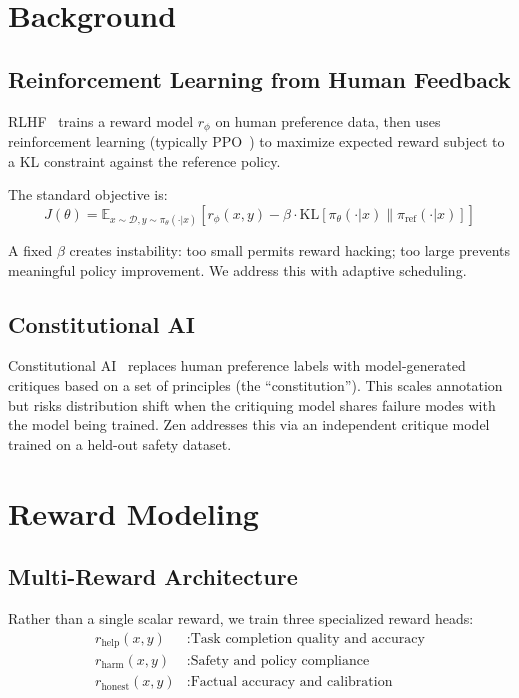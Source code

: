 \documentclass[11pt,a4paper]{article}
\begin{document}
\section{Background}

\subsection{Reinforcement Learning from Human Feedback}

RLHF~\cite{christiano2017deep,ouyang2022rlhf} trains a reward model $r_\phi$ on
human preference data, then uses reinforcement learning (typically PPO~\cite{schulman2017ppo})
to maximize expected reward subject to a KL constraint against the reference policy.

The standard objective is:
\begin{equation}
J(\theta) = \mathbb{E}_{x \sim \mathcal{D}, y \sim \pi_\theta(\cdot|x)}\left[r_\phi(x,y) - \beta \cdot \text{KL}[\pi_\theta(\cdot|x) \| \pi_\text{ref}(\cdot|x)]\right]
\end{equation}

A fixed $\beta$ creates instability: too small permits reward hacking; too large
prevents meaningful policy improvement. We address this with adaptive scheduling.

\subsection{Constitutional AI}

Constitutional AI~\cite{bai2022constitutional} replaces human preference labels
with model-generated critiques based on a set of principles (the ``constitution'').
This scales annotation but risks distribution shift when the critiquing model shares
failure modes with the model being trained. Zen addresses this via an independent
critique model trained on a held-out safety dataset.

\section{Reward Modeling}

\subsection{Multi-Reward Architecture}

Rather than a single scalar reward, we train three specialized reward heads:
\begin{align}
r_\text{help}(x,y) &: \text{Task completion quality and accuracy} \\
r_\text{harm}(x,y) &: \text{Safety and policy compliance} \\
r_\text{honest}(x,y) &: \text{Factual accuracy and calibration}
\end{align}
\end{document}
